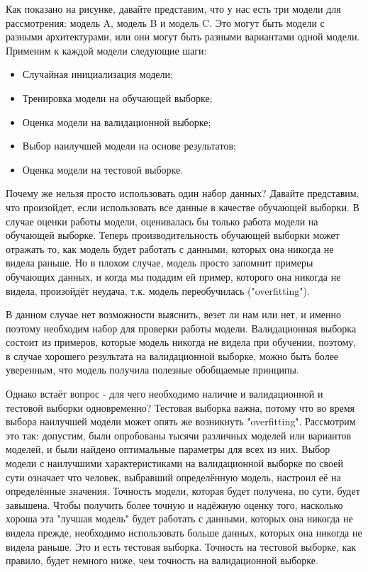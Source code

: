 Как показано на рисунке, давайте представим, что у нас есть три модели для рассмотрения: модель A, модель B и модель C. Это могут быть модели с разными архитектурами, или они могут быть разными вариантами одной модели. Применим к каждой модели следующие шаги:

\begin{itemize}
	\item Случайная инициализация модели;
	\item Тренировка модели на обучающей выборке;
	\item Оценка модели на валидационной выборке;
	\item Выбор наилучшей модели на основе результатов;
	\item Оценка модели на тестовой выборке.
\end{itemize}

Почему же нельзя просто использовать один набор данных? Давайте представим, что произойдет, если использовать все данные в качестве обучающей выборки. В случае оценки работы модели, оценивалась бы только работа модели на обучающей выборке. Теперь производительность обучающей выборки может отражать то, как модель будет работать с данными, которых она никогда не видела раньше. Но в плохом случае, модель просто запомнит примеры обучающих данных, и когда мы подадим ей пример, которого она никогда не видела, произойдёт неудача, т.к. модель переобучилась ("overfitting").

В данном случае нет возможности выяснить, везет ли нам или нет, и именно поэтому необходим набор для проверки работы модели. Валидационная выборка состоит из примеров, которые модель никогда не видела при обучении, поэтому, в случае хорошего результата на валидационной выборке, можно быть более уверенным, что модель получила полезные обобщаемые принципы.

Однако встаёт вопрос - для чего необходимо наличие и валидационной и тестовой выборки одновременно? Тестовая выборка важна, потому что во время выбора наилучшей модели может опять же возникнуть "overfitting". Рассмотрим это так: допустим, были опробованы тысячи различных моделей или вариантов моделей, и были найдено оптимальные параметры для всех из них. Выбор модели с наилучшими характеристиками на валидационной выборке по своей сути означает что человек, выбравший определённую модель, настроил её на определённые значения. Точность модели, которая будет получена, по сути, будет завышена. Чтобы получить более точную и надёжную оценку того, насколько хороша эта "лучшая модель" будет работать с данными, которых она никогда не видела прежде, необходимо использовать больше данных, которых она никогда не видела раньше. Это и есть тестовая выборка. Точность на тестовой выборке, как правило, будет немного ниже, чем точность на валидационной выборке. \cite{tdt2}

